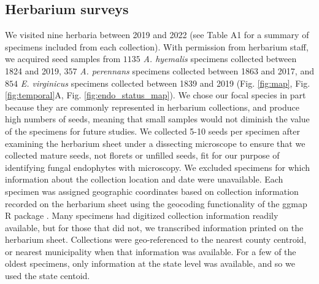 \documentclass[11pt]{article}
\begin{document}
		\subsection*{Herbarium surveys}
We visited nine herbaria between 2019 and 2022 (see Table A1 for a summary of specimens included from each collection). 
With permission from herbarium staff, we acquired seed samples from $1135$ \emph{A. hyemalis} specimens collected between 1824 and 2019, $357$ \emph{A. perennans} specimens collected between 1863 and 2017, and $854$ \emph{E. virginicus} specimens collected between 1839 and 2019 (Fig. \ref{fig:map}, Fig. \ref{fig:temporal}A, Fig. \ref{fig:endo_status_map}).
We chose our focal species in part because they are commonly represented in herbarium collections, and produce high numbers of seeds, meaning that small samples would not diminish the value of the specimens for future studies. 
We collected 5-10 seeds per specimen after examining the herbarium sheet under a dissecting microscope to ensure that we collected mature seeds, not florets or unfilled seeds, fit for our purpose of identifying fungal endophytes with microscopy.
We excluded specimens for which information about the collection location and date were unavailable.
Each specimen was assigned geographic coordinates based on collection information recorded on the herbarium sheet using the geocoding functionality of the ggmap R package \citep{kahle2019package}.
Many specimens had digitized collection information readily available, but for those that did not, we transcribed information printed on the herbarium sheet. 
Collections were geo-referenced to the nearest county centroid, or nearest municipality when that information was available. 
For a few of the oldest specimens, only information at the state level was available, and so we used the state centoid.
\end{document}
